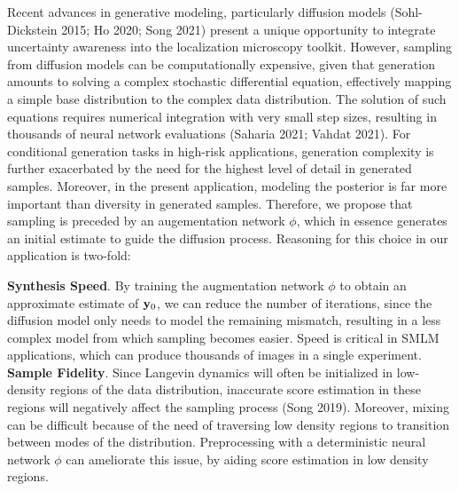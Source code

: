 \documentclass{article}
\begin{document}
Recent advances in generative modeling, particularly diffusion models (Sohl-Dickstein 2015; Ho 2020; Song 2021) present a unique opportunity to integrate uncertainty awareness into the localization microscopy toolkit. However, sampling from diffusion models can be computationally expensive, given that generation amounts to solving a complex stochastic differential equation, effectively mapping a simple base distribution to the complex data distribution. The solution of such equations requires numerical integration with very small step sizes, resulting in thousands of neural network evaluations (Saharia 2021; Vahdat 2021). For conditional generation tasks in high-risk applications, generation complexity is further exacerbated by the need for the highest level of detail in generated samples. Moreover, in the present application, modeling the posterior is far more important than diversity in generated samples. Therefore, we propose that sampling is preceded by an augementation network $\phi$, which in essence generates an initial estimate to guide the diffusion process. Reasoning for this choice in our application is two-fold:

\textbf{Synthesis Speed}. By training the augmentation network $\phi$ to obtain an approximate estimate of $\bold{y}_{0}$, we can reduce the number of iterations, since the diffusion model only needs to model the remaining mismatch, resulting in a less complex model from which sampling becomes easier. Speed is critical in SMLM applications, which can produce thousands of images in a single experiment.\\

\textbf{Sample Fidelity}. Since Langevin dynamics will often be initialized in low-density regions of the data distribution, inaccurate score estimation in these regions will negatively affect the sampling process (Song 2019). Moreover, mixing can be difficult because of the need of traversing low density regions to transition between modes of the distribution. Preprocessing with a deterministic neural network $\phi$ can ameliorate this issue, by aiding score estimation in low density regions. 



\end{document}
